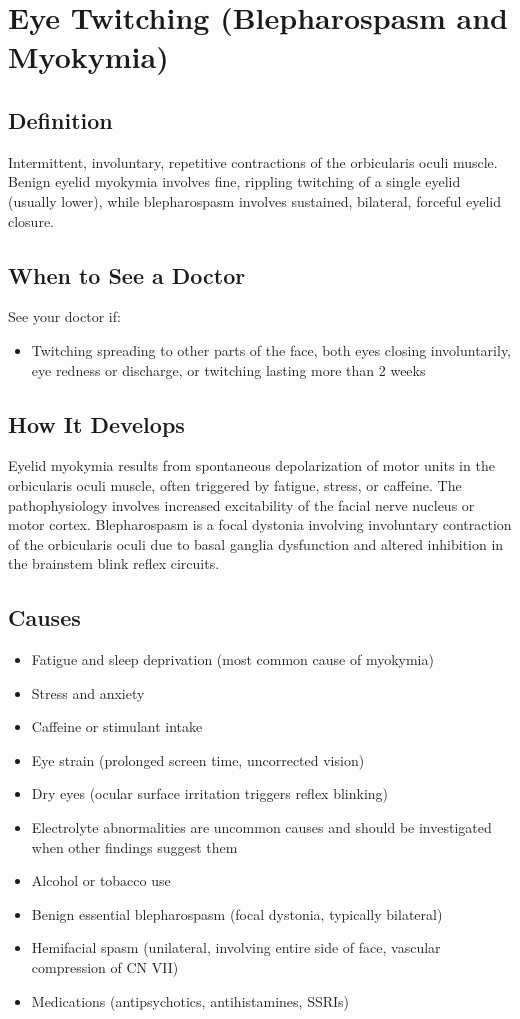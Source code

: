 \chapter{Eye Twitching (Blepharospasm and Myokymia)}

\section*{Definition}
Intermittent, involuntary, repetitive contractions of the orbicularis oculi muscle. Benign eyelid myokymia involves fine, rippling twitching of a single eyelid (usually lower), while blepharospasm involves sustained, bilateral, forceful eyelid closure.

\section*{When to See a Doctor}
See your doctor if:
\begin{itemize}
  \item Twitching spreading to other parts of the face, both eyes closing involuntarily, eye redness or discharge, or twitching lasting more than 2 weeks
\end{itemize}

\section*{How It Develops}
Eyelid myokymia results from spontaneous depolarization of motor units in the orbicularis oculi muscle, often triggered by fatigue, stress, or caffeine. The pathophysiology involves increased excitability of the facial nerve nucleus or motor cortex. Blepharospasm is a focal dystonia involving involuntary contraction of the orbicularis oculi due to basal ganglia dysfunction and altered inhibition in the brainstem blink reflex circuits.

\section*{Causes}
\begin{itemize}
  \item Fatigue and sleep deprivation (most common cause of myokymia)
  \item Stress and anxiety
  \item Caffeine or stimulant intake
  \item Eye strain (prolonged screen time, uncorrected vision)
  \item Dry eyes (ocular surface irritation triggers reflex blinking)
  \item Electrolyte abnormalities are uncommon causes and should be investigated when other findings suggest them
  \item Alcohol or tobacco use
  \item Benign essential blepharospasm (focal dystonia, typically bilateral)
  \item Hemifacial spasm (unilateral, involving entire side of face, vascular compression of CN VII)
  \item Medications (antipsychotics, antihistamines, SSRIs)
\end{itemize}

